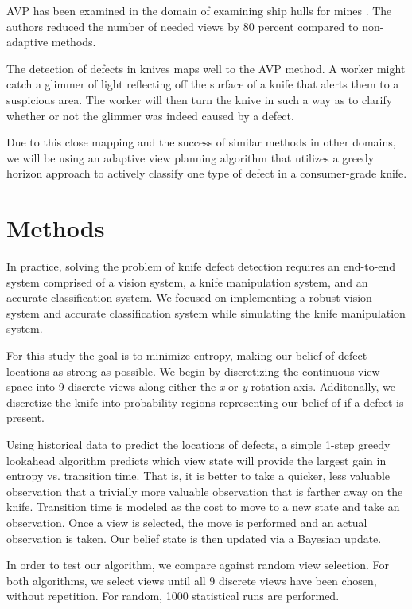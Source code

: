 \documentclass[letterpaper, 10 pt, conference]{ieeeconf}  %
\begin{document}
AVP has been examined in the domain of examining ship hulls for mines \cite{hollinger2011active}. The authors reduced the number of needed views by 80 percent compared to non-adaptive methods.

The detection of defects in knives maps well to the AVP method. A worker might catch a glimmer of light reflecting off the surface of a knife that alerts them to a suspicious area. The worker will then turn the knive in such a way as to clarify whether or not the glimmer was indeed caused by a defect. 

Due to this close mapping and the success of similar methods in other domains, we will be using an adaptive view planning algorithm that utilizes a greedy horizon approach to actively classify one type of defect in a consumer-grade knife.

\section{Methods}

In practice, solving the problem of knife defect detection requires an end-to-end system comprised of a vision system, a knife manipulation system, and an accurate classification system. We focused on implementing a robust vision system and accurate classification system while simulating the knife manipulation system.

For this study the goal is to minimize entropy, making our belief of defect locations as strong as possible. We begin by discretizing the continuous view space into 9 discrete views along either the \textit{x} or \textit{y} rotation axis. Additonally, we discretize the knife into probability regions representing our belief of if a defect is present.

Using historical data to predict the locations of defects, a simple 1-step greedy lookahead algorithm predicts which view state will provide the largest gain in entropy vs. transition time. That is, it is better to take a quicker, less valuable observation that a trivially more valuable observation that is farther away on the knife. Transition time is modeled as the cost to move to a new state and take an observation. Once a view is selected, the move is performed and an actual observation is taken. Our belief state is then updated via a Bayesian update.

In order to test our algorithm, we compare against random view selection. For both algorithms, we select views until all 9 discrete views have been chosen, without repetition. For random, 1000 statistical runs are performed.
\end{document}
